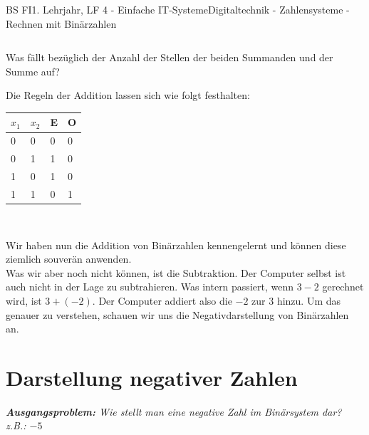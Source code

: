 \documentclass[11pt,twocolumn,oneside,openany,headings=optiontotoc,11pt,numbers=noenddot]{article}
\begin{document}
\begin{worksheet}{BS FI}{1. Lehrjahr, LF 4 - Einfache IT-Systeme}{Digitaltechnik - Zahlensysteme - Rechnen mit Binärzahlen}
\begin{framed}
\begin{tabularx}{0.4\textwidth}{llllll}
				\cline{2-6}
			\end{tabularx}
		\end{framed}
		\noindent
		Was fällt bezüglich der Anzahl der Stellen der beiden Summanden und der Summe auf?\\
		\par\noindent
		Die Regeln der Addition lassen sich wie folgt festhalten:\\
		\par\noindent
		\begin{tabularx}{0.48\textwidth}{MM|MM}
			\(x_1\) & \(x_2\) & E & O\\
			 & 0 & 0 & 0\\
			0 & 1 & 1 & 0\\
			1 & 0 & 1 & 0\\
			1 & 1 & 0 & 1\\
		\end{tabularx}\\
		\par\bigskip\noindent
		Wir haben nun die Addition von Binärzahlen kennengelernt und können diese ziemlich souverän anwenden.\\
		Was wir aber noch nicht können, ist die Subtraktion. Der Computer selbst ist auch nicht in der Lage zu subtrahieren. Was intern passiert, wenn \(3 - 2\) gerechnet wird, ist \(3 + (-2)\). Der Computer addiert also die \(-2\) zur \(3\) hinzu. Um das genauer zu verstehen, schauen wir uns die Negativdarstellung von Binärzahlen an.
		\section{Darstellung negativer Zahlen}
		\textit{\textbf{Ausgangsproblem:} Wie stellt man eine negative Zahl im Binärsystem dar? z.B.: \(-5\)}\\

\end{worksheet}
\end{document}
